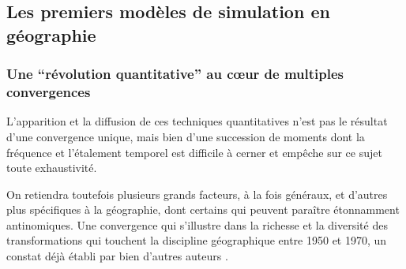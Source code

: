 



\subsection{Les premiers modèles de simulation en géographie}
\label{sec:premier_modele_geo}

\subsubsection{Une \enquote{révolution quantitative} au cœur de multiples convergences}
\label{ssec:revol_quanti}

L'apparition et la diffusion de ces techniques quantitatives n'est pas le résultat d'une convergence unique, mais bien d'une succession de moments dont la fréquence et l'étalement temporel est difficile à cerner et empêche sur ce sujet toute exhaustivité.

On retiendra toutefois plusieurs grands facteurs, à la fois généraux, et d'autres plus spécifiques à la géographie, dont certains qui peuvent paraître étonnamment antinomiques. Une convergence qui s'illustre dans la richesse et la diversité des transformations qui touchent la discipline géographique entre 1950 et 1970, un constat déjà établi par bien d'autres auteurs \autocite{Varenne2014}.

